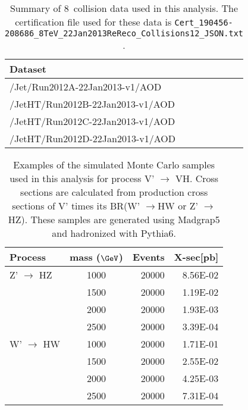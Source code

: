 \begin{table}[htb]
\begin{center}
\begin{tabular}{ |l| }
\hline
Dataset                                 \\
\hline
/Jet/Run2012A-22Jan2013-v1/AOD  \\
/JetHT/Run2012B-22Jan2013-v1/AOD  \\
/JetHT/Run2012C-22Jan2013-v1/AOD  \\
/JetHT/Run2012D-22Jan2013-v1/AOD  \\
\hline
\end{tabular} 
\end{center}
\caption{Summary of 8~\TeVcc collision data used in this analysis. 
The certification file used for these data is 
{\tt Cert\_190456-208686\_8TeV\_22Jan2013ReReco\_Collisions12\_JSON.txt
}.
}
\label{table:dataset}
\end{table}

\begin{table}[htb]
\begin{center}
\begin{tabular}{ |l|c|r|r| }
\hline
Process     & mass ($\GeVcc$) & Events & X-sec[pb] \\
\hline
Z' $\to$ HZ & 1000   &20000   & 8.56E-02 \\
 & 1500   &20000              & 1.19E-02 \\
 & 2000   &20000              & 1.93E-03 \\
 & 2500  &20000               & 3.39E-04  \\\hline
W' $\to$ HW& 1000   &20000   &  1.71E-01  \\
 & 1500 &20000               &  2.55E-02  \\
 & 2000 &20000               &  4.25E-03  \\
 & 2500  &20000              &  7.31E-04  \\
\hline
\end{tabular}
\end{center}
\caption{Examples of the simulated Monte Carlo samples used in this analysis for process
 V' $\to$ VH. Cross sections are calculated from 
production cross sections of V' times its BR(W' $\to$HW or Z' $\to$ HZ). 
 These samples are generated using Madgrap5 and hadronized with Pythia6. }
\label{table:Hww}
\end{table}


